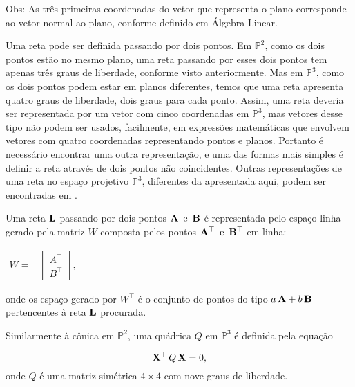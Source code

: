 Obs: As três primeiras coordenadas do vetor que representa o plano corresponde ao vetor normal ao plano, conforme definido em Álgebra Linear.
\\



Uma reta pode ser definida passando por dois pontos. Em $\mathbb{P}^2$, como os dois pontos estão no mesmo plano, uma reta passando por esses dois pontos tem apenas três graus de liberdade, conforme visto anteriormente. Mas em $\mathbb{P}^3$, como os dois pontos podem estar em planos diferentes, temos que uma reta apresenta quatro graus de liberdade, dois graus para cada ponto. Assim, uma reta deveria ser representada por um vetor com cinco coordenadas em $\mathbb{P}^3$, mas vetores desse tipo não podem ser usados, facilmente, em expressões matemáticas que envolvem vetores com quatro coordenadas representando pontos e planos. Portanto é necessário encontrar uma outra representação, e uma das formas mais simples é definir a reta através de dois pontos não coincidentes. Outras representações de uma reta no espaço projetivo $\mathbb{P}^3$, diferentes da apresentada aqui, podem ser encontradas em \cite{Hartley2004}.


Uma reta ${\bf L}$ passando por dois pontos ${\bf A} \,\,\, \text{e} \,\,\, {\bf B}$ é representada pelo espaço linha gerado pela matriz $W$ composta pelos pontos ${\bf A}^\top \,\,\,\text{e} \,\,\, {\bf B}^\top$ em linha:

\begin{center}
$
\begin{array}{cc}
W = 
& \begin{bmatrix}
  A^\top\\
  B^\top
  \end{bmatrix},
\end{array}
$
\end{center}
onde os espaço gerado por $W^\top$ é o conjunto de pontos do tipo $a\,{\bf A} + b\,{\bf B}$ pertencentes à reta ${\bf L}$ procurada. \\




Similarmente à cônica em $\mathbb{P}^2$, uma quádrica $Q$ em $\mathbb{P}^3$ é definida pela equação

\begin{equation*}
\mathbf{X}^\top\,Q\,\mathbf{X} = 0,
\end{equation*}
onde $Q$ é uma matriz simétrica $4\times4$ com nove graus de liberdade.




